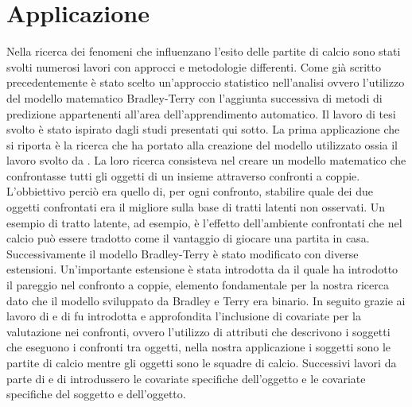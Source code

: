 \section{Applicazione}
Nella ricerca dei fenomeni che influenzano l'esito delle partite di calcio sono stati svolti numerosi lavori con approcci e metodologie differenti. Come già scritto precedentemente è stato scelto un'approccio statistico nell'analisi ovvero l'utilizzo del modello matematico Bradley-Terry \autocite{bradley1952rank} con l'aggiunta successiva di metodi di predizione appartenenti all'area dell'apprendimento automatico. %
Il lavoro di tesi svolto è stato ispirato dagli studi presentati qui sotto.
La prima applicazione che si riporta è la ricerca che ha portato alla creazione del modello utilizzato ossia il lavoro svolto da \textcite{bradley1952rank}. La loro ricerca consisteva nel creare un modello matematico che confrontasse tutti gli oggetti di un insieme attraverso confronti a coppie. L'obbiettivo perciò era quello di, per ogni confronto, stabilire quale dei due oggetti confrontati era il migliore sulla base di tratti latenti non osservati. Un esempio di tratto latente, ad esempio, è l'effetto dell'ambiente confrontati che nel calcio può essere tradotto come il vantaggio di giocare una partita in casa. Successivamente il modello Bradley-Terry è stato modificato con diverse estensioni. Un'importante estensione è stata introdotta da \textcite{davidson1970extending} il quale ha introdotto il pareggio nel confronto a coppie, elemento fondamentale per la nostra ricerca dato che il modello sviluppato da Bradley e Terry era binario. In seguito grazie ai lavoro di \textcite{francis2010} e di \textcite{Turner2012Firth} fu introdotta e approfondita l'inclusione di covariate per la valutazione nei confronti, ovvero l'utilizzo di attributi che descrivono i soggetti che eseguono i confronti tra oggetti, nella nostra applicazione i soggetti sono le partite di calcio mentre gli oggetti sono le squadre di calcio. Successivi lavori da parte di \textcite{thurner2000policy} e di \textcite{mauerer2015modeling} introdussero le covariate specifiche dell'oggetto e le covariate specifiche del soggetto e dell'oggetto. %
